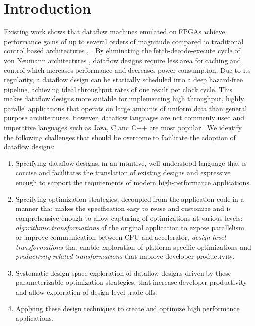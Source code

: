 \section{Introduction}

Existing work shows that dataflow machines emulated on FPGAs achieve
performance gains of up to several orders of magnitude compared to
traditional control based architectures \cite{Flynn:Pell:Mencer:2012},
\cite{Mencer:2012}. By eliminating the fetch-decode-execute cycle of
von Neumann architectures \cite{Neumann:1993}, dataflow designs
require less area for caching and control which increases performance
and decreases power consumption. Due to its regularity, a dataflow
design can be statically scheduled into a deep hazard-free pipeline,
achieving ideal throughput rates of one result per clock cycle. This
makes dataflow designs more suitable for implementing high throughput,
highly parallel applications that operate on large amounts of uniform
data than general purpose architectures. However, dataflow languages
are not commonly used and imperative languages such as Java, C and C++
are most popular \cite{Tiobe:2012}. We identify the following
challenges that should be overcome to facilitate the adoption of
dataflow designs:
\begin{enumerate}
\item Specifying dataflow designs, in an intuitive, well understood
  language that is concise and facilitates the translation of existing
  designs and expressive enough to support the requirements of modern
  high-performance applications.
\item Specifying optimization strategies, decoupled from the
  application code in a manner that makes the specification easy to
  reuse and customize and is comprehensive enough to allow capturing
  of optimizations at various levels: \emph{algorithmic
    transformations} of the original application to expose parallelism
  or improve communication between CPU and accelerator,
  \emph{design-level transformations} that enable exploration of
  platform specific optimizations and \emph{productivity related
    transformations} that improve developer productivity.
\item Systematic design space exploration of dataflow designs driven
  by these parameterizable optimization strategies, that increase
  developer productivity and allow exploration of design level
  trade-offs.
\item Applying these design techniques to create and optimize high
  performance applications.
\end{enumerate}

